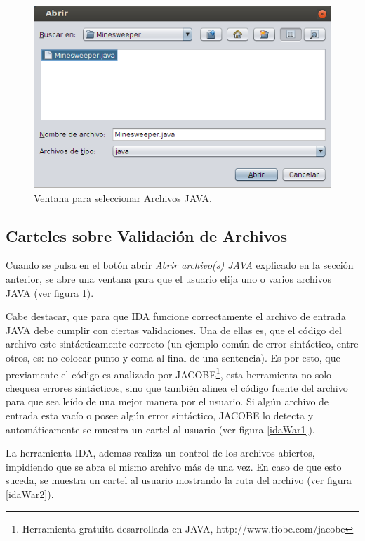 \documentclass[a4paper,12pt]{report}
\begin{document}
\begin{figure}[t] %
\centerline{%
\includegraphics[scale= 0.7]{./ida_02.png}
}
\caption{Ventana para seleccionar Archivos JAVA.}
\label{ida2}
\end{figure}

\subsection{Carteles sobre Validación de Archivos}

Cuando se pulsa en el botón abrir \textit{Abrir archivo(s) JAVA} explicado en la sección anterior, se abre una ventana para que el usuario elija uno o varios archivos JAVA (ver figura \ref{ida2}).

Cabe destacar, que para que IDA funcione correctamente el archivo de entrada JAVA debe cumplir con ciertas validaciones. Una de ellas es, que el código del archivo este sintácticamente correcto (un ejemplo común de error sintáctico, entre otros,  es: no colocar punto y coma al final de una sentencia). Es por esto, que previamente el código es analizado por JACOBE\footnote[1]{Herramienta gratuita desarrollada en JAVA, http://www.tiobe.com/jacobe}, esta herramienta no solo chequea errores sintácticos, sino que también alinea el código fuente del archivo para que sea leído de una mejor manera por el usuario. Si algún archivo de entrada esta vacío o posee algún error sintáctico, JACOBE lo detecta y automáticamente se muestra un cartel al usuario (ver figura \ref{idaWar1}).

La herramienta IDA, ademas realiza un control de los archivos abiertos, impidiendo que se abra el mismo archivo más de una vez. En caso de que esto suceda, se muestra un cartel al usuario mostrando la ruta del archivo (ver figura \ref{idaWar2}).
\end{document}
